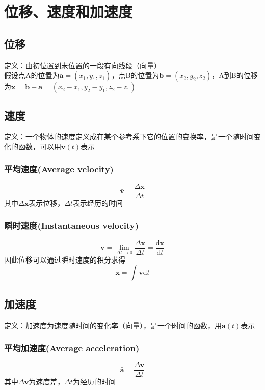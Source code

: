 \documentclass[a4paper,oneside,11pt]{article}
\newcommand{\bol}[1]{\textbf{#1}}
\newcommand{\diff}{\mathrm{d}}
\begin{document}
\section{位移、速度和加速度}
\subsection{位移}
定义：由初位置到末位置的一段有向线段（向量）\\
假设点A的位置为$\bol{a} = (x_1, y_1, z_1)$，点B的位置为$\bol{b} = (x_2, y_2, z_2)$，A到B的位移为$\bol{x} = \bol{b} - \bol{a} = (x_2 - x_1 , y_2 - y_1, z_2 - z_1)$
\subsection{速度}
定义：一个物体的速度定义成在某个参考系下它的位置的变换率，是一个随时间变化的函数，可以用$\bol{v}(t)$表示
\subsubsection{平均速度(Average velocity)}
\begin{displaymath}
	\bar{\bol{v}} = \frac{\Delta \bol{x}}{\Delta t}
\end{displaymath}
其中$\Delta \bol{x}$表示位移，$\Delta t$表示经历的时间
\subsubsection{瞬时速度(Instantaneous velocity)}
\begin{displaymath}
	\bol{v} = \lim_{\Delta t \to 0}\frac{\Delta \bol{x}}{\Delta t} = \frac{\diff\bol{x}}{\diff t}
\end{displaymath}
因此位移可以通过瞬时速度的积分求得
\begin{displaymath}
\bol{x} = \int\bol{v}\diff t
\end{displaymath}
\subsection{加速度}
定义：加速度为速度随时间的变化率（向量），是一个时间的函数，用$\bol{a}(t)$表示
\subsubsection{平均加速度(Average acceleration)}
\begin{displaymath}
	\bar{\bol{a}} = \frac{\Delta \bol{v}}{\Delta t}
\end{displaymath}
其中$\Delta \bol{v}$为速度差，$\Delta t$为经历的时间
\end{document}
